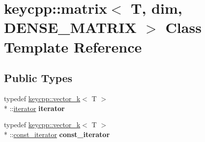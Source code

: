 \hypertarget{classkeycpp_1_1matrix_3_01_t_00_01dim_00_01_d_e_n_s_e___m_a_t_r_i_x_01_4}{\section{keycpp\-:\-:matrix$<$ T, dim, D\-E\-N\-S\-E\-\_\-\-M\-A\-T\-R\-I\-X $>$ Class Template Reference}
\label{classkeycpp_1_1matrix_3_01_t_00_01dim_00_01_d_e_n_s_e___m_a_t_r_i_x_01_4}
}
\subsection*{Public Types}
\begin{DoxyCompactItemize}
\item 
\hypertarget{classkeycpp_1_1matrix_3_01_t_00_01dim_00_01_d_e_n_s_e___m_a_t_r_i_x_01_4_aa037b5071f23e2ceeed4ed5710334ae0}{typedef \hyperlink{classkeycpp_1_1vector__k}{keycpp\-::vector\-\_\-k}$<$ T $>$\\*
\-::\hyperlink{classkeycpp_1_1_pointer_iterator}{iterator} {\bfseries iterator}}\label{classkeycpp_1_1matrix_3_01_t_00_01dim_00_01_d_e_n_s_e___m_a_t_r_i_x_01_4_aa037b5071f23e2ceeed4ed5710334ae0}

\item 
\hypertarget{classkeycpp_1_1matrix_3_01_t_00_01dim_00_01_d_e_n_s_e___m_a_t_r_i_x_01_4_a35bd9c01e306676c01b2e12b3c976419}{typedef \hyperlink{classkeycpp_1_1vector__k}{keycpp\-::vector\-\_\-k}$<$ T $>$\\*
\-::\hyperlink{classkeycpp_1_1_pointer_iterator}{const\-\_\-iterator} {\bfseries const\-\_\-iterator}}\label{classkeycpp_1_1matrix_3_01_t_00_01dim_00_01_d_e_n_s_e___m_a_t_r_i_x_01_4_a35bd9c01e306676c01b2e12b3c976419}

\end{DoxyCompactItemize}
